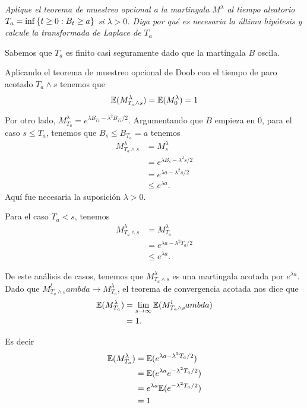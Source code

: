 \emph{
    Aplique el teorema de muestreo opcional a la martingala 
    $M^\lambda $ al tiempo aleatorio $T_a=\inf\left\{ t\geq 0:B_t\geq a\right\} $ 
    si $\lambda>0$. Diga por qu\'e es necesaria la \'ultima 
    hip\'otesis y calcule la transformada de Laplace de $T_a$
}

\afterstatement\pn

Sabemos que $T_a$ es finito casi seguramente dado que la martingala $B$ oscila.\pn

Aplicando el teorema de muestreo opcional de Doob con el tiempo de paro acotado
$T_a \wedge s$ tenemos que
\begin{align}
    \mathbb{E}(M_{T_a \wedge s}^\lambda) = \mathbb{E}(M_0^\lambda) = 1
\end{align}\pn

Por otro lado, $M_{T_a}^\lambda = e^{\lambda B_{T_a} - \lambda^2 B_{T_a}/2}$. Argumentando que $B$ empieza en 0, 
para el caso $s \leq T_a$, tenemos que $B_s \leq B_{T_a} = a$ tenemos 
\begin{align}
    M_{T_a \wedge s}^\lambda    &=  M_{s}^\lambda                       \\
                                &=  e^{\lambda B_{s} - \lambda^2 s/2}   \\
                                &=  e^{\lambda a - \lambda^2 s/2}       \\
                                &\leq e^{\lambda a}.   
\end{align}
Aquí fue necesaria la suposición $\lambda > 0$.\pn

Para el caso $T_a < s$, tenemos
\begin{align}
    M_{T_a \wedge s}^\lambda    &=      M_{T_a}^\lambda                 \\
                                &=      e^{\lambda a - \lambda^2 T_a/2} \\
                                &\leq   e^{\lambda a}.
\end{align}\pn

De este análisis de casos, tenemos que $M_{T_a \wedge s}^\lambda$ es una martingala acotada por $e^{\lambda a}$.
Dado que $M_{T_a \wedge s}^lambda \rightarrow M_{T_a}^\lambda$, el teorema de convergencia acotada nos dice que
\begin{align}
    \mathbb{E}(M_{T_a}^\lambda) &=  \lim_{s \rightarrow \infty} \mathbb{E}(M_{T_a \wedge s}^lambda)   \\
                        &=  1.
\end{align}

Es decir
\begin{align}
    \mathbb{E}(M_{T_a}^\lambda) &=  \mathbb{E}(e^{\lambda a - \lambda^2 T_a/2})         \\
                        &=  \mathbb{E}(e^{\lambda a} e^{-\lambda^2 T_a/2})      \\
                        &=  e^{\lambda a} \mathbb{E}(e^{-\lambda^2 T_a/2})      \\
                        &=  1
\end{align}

